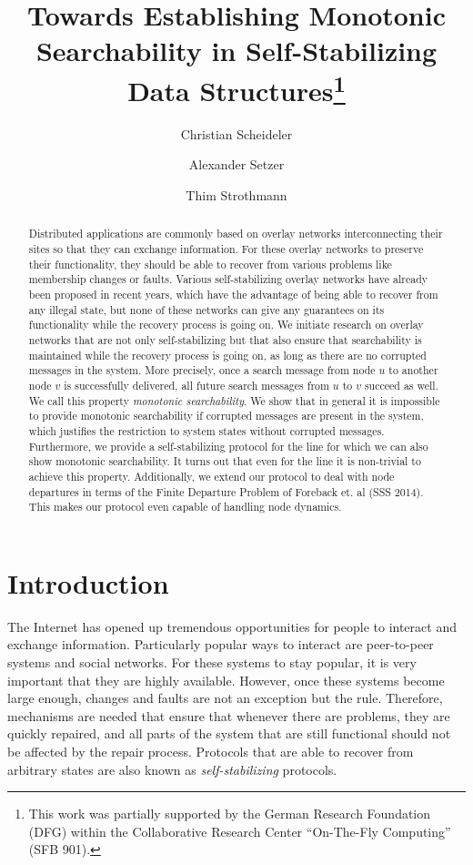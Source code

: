 \documentclass[a4paper,USenglish]{lipics}
\title{Towards Establishing Monotonic Searchability in Self-Stabilizing Data Structures\footnote{This work was partially supported by the German Research Foundation (DFG) within the Collaborative Research Center ``On-The-Fly Computing'' (SFB 901).}}
\author[1]{Christian Scheideler}
\author[2]{Alexander Setzer}
\author[3]{Thim Strothmann}
\affil[1]{Paderborn University\\
  Fürstenallee 11, Paderborn, Germany}
\affil[2]{Paderborn University\\
  Fürstenallee 11, Paderborn, Germany}
\affil[3]{Paderborn University\\
  Fürstenallee 11, Paderborn, Germany}
\begin{document}
\maketitle

\begin{abstract}
Distributed applications are commonly based on overlay networks interconnecting their sites so that they can exchange information. 
For these overlay networks to preserve their functionality, they should be able to recover from various problems like membership changes or faults. 
Various self-stabilizing overlay networks have already been proposed in recent years, which have the advantage of being able to recover from any illegal state, but none of these networks can give any guarantees on its functionality while the recovery process is going on. 
We initiate research on overlay networks that are not only self-stabilizing but that also ensure that searchability is maintained while the recovery process is going on, as long as there are no corrupted messages in the system. 
More precisely, once a search message from node $u$ to another node $v$ is successfully delivered, all future search messages from $u$ to $v$ succeed as well. 
We call this property {\em monotonic searchability}.
 We show that in general it is impossible to provide monotonic searchability if corrupted messages are present in the system, which justifies the restriction to system states without corrupted messages. 
 Furthermore, we provide a self-stabilizing protocol for the line for which we can also show monotonic searchability. 
 It turns out that even for the line it is non-trivial to achieve this property. 
 Additionally, we extend our protocol to deal with node departures in terms of the Finite Departure Problem of Foreback et. al (SSS 2014). 
 This makes our protocol even capable of handling node dynamics.
 \end{abstract}


\section{Introduction}
The Internet has opened up tremendous opportunities for people to interact and exchange information.
 Particularly popular ways to interact are peer-to-peer systems and social networks. 
 For these systems to stay popular, it is very important that they are highly available. 
 However, once these systems become large enough, changes and faults are not an exception but the rule.
Therefore, mechanisms are needed that ensure that whenever there are problems, they are quickly repaired, and all parts of the system that are still functional should not be affected by the repair process. 
Protocols that are able to recover from arbitrary states are also known as \emph{self-stabilizing} protocols.
\end{document}
